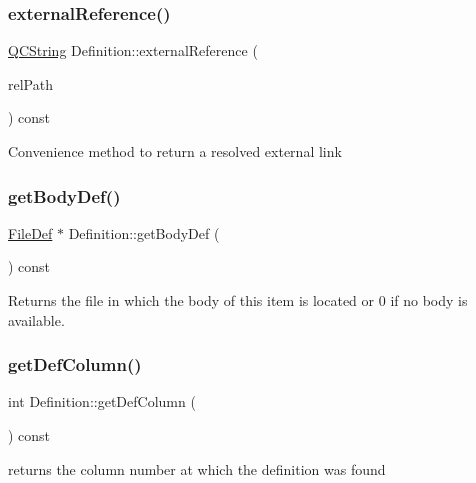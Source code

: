 \subsubsection{\texorpdfstring{externalReference()}{externalReference()}}
{\footnotesize\ttfamily \mbox{\hyperlink{class_q_c_string}{Q\+C\+String}} Definition\+::external\+Reference (\begin{DoxyParamCaption}\item[{const \mbox{\hyperlink{class_q_c_string}{Q\+C\+String}} \&}]{rel\+Path }\end{DoxyParamCaption}) const}

Convenience method to return a resolved external link \mbox{\label{class_definition_a9854754d60caad76e897b156ba13d992}} 
\subsubsection{\texorpdfstring{getBodyDef()}{getBodyDef()}}
{\footnotesize\ttfamily \mbox{\hyperlink{class_file_def}{File\+Def}} $\ast$ Definition\+::get\+Body\+Def (\begin{DoxyParamCaption}{ }\end{DoxyParamCaption}) const}

Returns the file in which the body of this item is located or 0 if no body is available. \mbox{\label{class_definition_a181d60d2e51d5550e5905732cedc51ed}} 
\subsubsection{\texorpdfstring{getDefColumn()}{getDefColumn()}}
{\footnotesize\ttfamily int Definition\+::get\+Def\+Column (\begin{DoxyParamCaption}{ }\end{DoxyParamCaption}) const\hspace{0.3cm}{\ttfamily [inline]}}

returns the column number at which the definition was found \mbox{\label{class_definition_a3775acf5b1b6bc11e096896b80fc663e}} 
